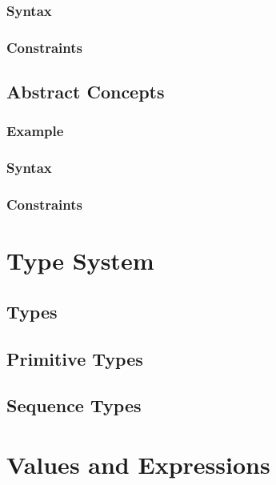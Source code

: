 \documentclass[a4paper,oneside,12pt, extrafontsizes]{memoir}
\theoremstyle{definition}
\theoremstyle{definition}
\theoremstyle{definition}
\theoremstyle{definition}
\begin{document}
\section{Syntax}


\section{Constraints}


\chapter{Abstract Concepts}
\label{ch:abstract}


\section{Example}


\section{Syntax}


\section{Constraints}


\part{Type System}

\chapter{Types}

\chapter{Primitive Types}
\label{ch:primitive-types}


\chapter{Sequence Types}
\label{ch:sequence-types}

\part{Values and Expressions}
\end{document}
